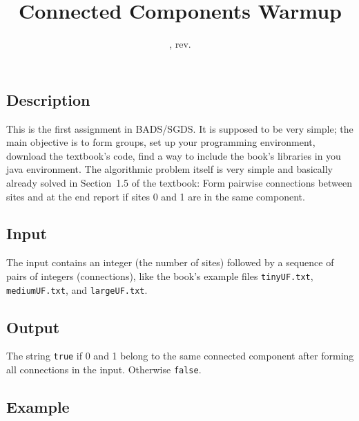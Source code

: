 \documentclass{tufte-handout}
\title{Connected Components Warmup}
\date{\GITAuthorDate, rev. \GITAbrHash}
\author{}
\begin{document}
\maketitle

\subsection{Description}

This is the first assignment in BADS/SGDS. 
It is supposed to be very simple; the main objective is to form groups, set up your programming environment, download the textbook's code, find a way to include the book's libraries in you java environment.
The algorithmic problem itself is very simple and basically already solved in Section~1.5 of the textbook:
Form pairwise connections between sites and at the end report if sites 0 and 1 are in the same component.

\subsection{Input}

The input contains an integer (the number of sites) followed by a sequence of pairs of integers (connections), like the book's example files {\tt tinyUF.txt}, {\tt mediumUF.txt}, and {\tt largeUF.txt}.


\subsection{Output}

The string {\tt true} if 0 and 1 belong to the same connected component after forming all connections in the input. 
Otherwise {\tt false}.

\subsection{Example}
\end{document}
